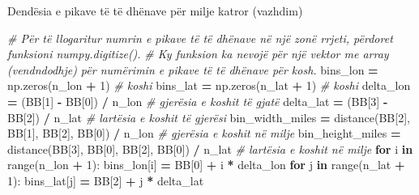 \documentclass[
  ignorenonframetext,
]{beamer}
\newenvironment{Shaded}{\begin{snugshade}}{\end{snugshade}}
\newcommand{\BuiltInTok}[1]{#1}
\newcommand{\CommentTok}[1]{\textcolor[rgb]{0.56,0.35,0.01}{\textit{#1}}}
\newcommand{\ControlFlowTok}[1]{\textcolor[rgb]{0.13,0.29,0.53}{\textbf{#1}}}
\newcommand{\DecValTok}[1]{\textcolor[rgb]{0.00,0.00,0.81}{#1}}
\newcommand{\KeywordTok}[1]{\textcolor[rgb]{0.13,0.29,0.53}{\textbf{#1}}}
\newcommand{\NormalTok}[1]{#1}
\newcommand{\OperatorTok}[1]{\textcolor[rgb]{0.81,0.36,0.00}{\textbf{#1}}}
\begin{document}
\begin{frame}[fragile]{Dendësia e pikave të të dhënave për milje katror
(vazhdim)}
\protect\hypertarget{denduxebsia-e-pikave-tuxeb-tuxeb-dhuxebnave-puxebr-milje-katror-vazhdim}{}

\begin{Shaded}
\begin{Highlighting}[]
\CommentTok{\# Për të llogaritur numrin e pikave të të dhënave në një zonë rrjeti, përdoret funksioni numpy.digitize().}
\CommentTok{\# Ky funksion ka nevojë për një vektor me array (vendndodhje) për numërimin e pikave të të dhënave për kosh.}
\NormalTok{bins\_lon }\OperatorTok{=}\NormalTok{ np.zeros(n\_lon }\OperatorTok{+} \DecValTok{1}\NormalTok{)  }\CommentTok{\# koshi}
\NormalTok{bins\_lat }\OperatorTok{=}\NormalTok{ np.zeros(n\_lat }\OperatorTok{+} \DecValTok{1}\NormalTok{)  }\CommentTok{\# koshi}
\NormalTok{delta\_lon }\OperatorTok{=}\NormalTok{ (BB[}\DecValTok{1}\NormalTok{] }\OperatorTok{{-}}\NormalTok{ BB[}\DecValTok{0}\NormalTok{]) }\OperatorTok{/}\NormalTok{ n\_lon  }\CommentTok{\# gjerësia e koshit të gjatë}
\NormalTok{delta\_lat }\OperatorTok{=}\NormalTok{ (BB[}\DecValTok{3}\NormalTok{] }\OperatorTok{{-}}\NormalTok{ BB[}\DecValTok{2}\NormalTok{]) }\OperatorTok{/}\NormalTok{ n\_lat  }\CommentTok{\# lartësia e koshit të gjerësi}
\NormalTok{bin\_width\_miles }\OperatorTok{=}\NormalTok{ distance(BB[}\DecValTok{2}\NormalTok{], BB[}\DecValTok{1}\NormalTok{], BB[}\DecValTok{2}\NormalTok{], BB[}\DecValTok{0}\NormalTok{]) }\OperatorTok{/}\NormalTok{ n\_lon  }\CommentTok{\# gjerësia e koshit në milje}
\NormalTok{bin\_height\_miles }\OperatorTok{=}\NormalTok{ distance(BB[}\DecValTok{3}\NormalTok{], BB[}\DecValTok{0}\NormalTok{], BB[}\DecValTok{2}\NormalTok{], BB[}\DecValTok{0}\NormalTok{]) }\OperatorTok{/}\NormalTok{ n\_lat  }\CommentTok{\# lartësia e koshit në milje}
\ControlFlowTok{for}\NormalTok{ i }\KeywordTok{in} \BuiltInTok{range}\NormalTok{(n\_lon }\OperatorTok{+} \DecValTok{1}\NormalTok{):}
\NormalTok{    bins\_lon[i] }\OperatorTok{=}\NormalTok{ BB[}\DecValTok{0}\NormalTok{] }\OperatorTok{+}\NormalTok{ i }\OperatorTok{*}\NormalTok{ delta\_lon}
\ControlFlowTok{for}\NormalTok{ j }\KeywordTok{in} \BuiltInTok{range}\NormalTok{(n\_lat }\OperatorTok{+} \DecValTok{1}\NormalTok{):}
\NormalTok{    bins\_lat[j] }\OperatorTok{=}\NormalTok{ BB[}\DecValTok{2}\NormalTok{] }\OperatorTok{+}\NormalTok{ j }\OperatorTok{*}\NormalTok{ delta\_lat}
\end{Highlighting}
\end{Shaded}
\end{frame}
\end{document}

